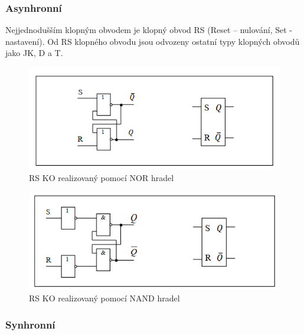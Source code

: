 \subsubsection{Asynhronní}
Nejjednodušším klopným obvodem je klopný obvod RS (Reset – nulování, Set -
nastavení). Od RS klopného obvodu jsou odvozeny ostatní typy klopných obvodů jako JK, D
a T.
   \begin{figure}[h]
   \begin{center}
     \includegraphics[scale=0.6]{images/RS.png}
   \end{center}
   \caption{RS KO realizovaný pomocí NOR hradel}
  \end{figure}
   \begin{figure}[h]
   \begin{center}
     \includegraphics[scale=0.6]{images/RSNAND.png}
   \end{center}
   \caption{RS KO realizovaný pomocí NAND hradel}
  \end{figure}

\subsubsection{Synhronní}
